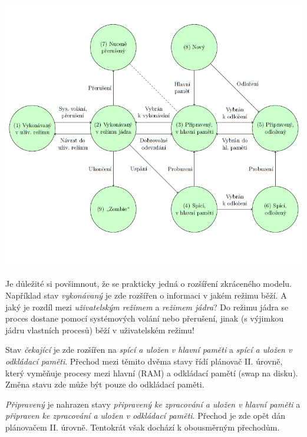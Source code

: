 \begin{center}
    \includegraphics[scale=0.9]{BPC-SOS/images/proc_extended_states.png}
\end{center}

Je důležité si povšimnout, že se prakticky jedná o rozšíření zkráceného modelu. Například stav \textit{vykonávaný} je zde rozšířen o informaci v jakém režimu běží. A jaký je rozdíl mezi \textit{uživatelským režimem} a \textit{režimem jádra}? Do režimu jádra se proces dostane pomocí systémových volání nebo přerušení, jinak (s výjimkou jádru vlastních procesů) běží v uživatelském režimu!

\vspace{0,5cm}

Stav \textit{čekající} je zde rozšířen na \textit{spící a uložen v hlavní paměti} a \textit{spící a uložen v odkládací paměti}. Přechod mezi těmito dvěma stavy řídí plánovač II. úrovně, který vyměňuje procesy mezi hlavní (RAM) a odkládací pamětí (swap na disku). Změna stavu zde může být pouze do odkládací paměti. 

\vspace{0,5cm}

\textit{Připravený} je nahrazen stavy \textit{připravený ke zpracování a uložen v hlavní paměti} a \textit{připraven ke zpracování a uložen v odkládací paměti}. Přechod je zde opět dán plánovačem II. úrovně. Tentokrát však dochází k obousměrným přechodům. 

\vspace{0,5cm}

